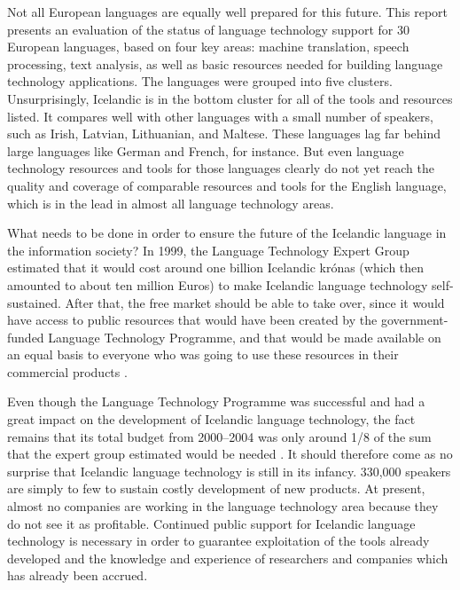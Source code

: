 \begin{multicols}{2}
Not all European languages are equally well prepared for this future. This report presents an evaluation of the status of language technology support for 30 European languages, based on four key areas: machine translation, speech processing, text analysis, as well as basic resources needed for building language technology applications. The languages were grouped into five clusters. Unsurprisingly, Icelandic is in the bottom cluster for all of the tools and resources listed. It compares well with other languages with a small number of speakers, such as Irish, Latvian, Lithuanian, and Maltese. These languages lag far behind large languages like German and French, for instance. But even language technology resources and tools for those languages clearly do not yet reach the quality and coverage of comparable resources and tools for the English language, which is in the lead in almost all language technology areas.

What needs to be done in order to ensure the future of the Icelandic language in the information society? In 1999, the Language Technology Expert Group estimated that it would cost around one billion Icelandic krónas (which then amounted to about ten million Euros) to make Icelandic language technology self-sustained. After that, the free market should be able to take over, since it would have access to public resources that would have been created by the government-funded Language Technology Programme, and that would be made available on an equal basis to everyone who was going to use these resources in their commercial products \cite{sky1}.

Even though the Language Technology Programme was successful and had a great impact on the development of Icelandic language technology, the fact remains that its total budget from 2000--2004 was only around 1/8 of the sum that the expert group estimated would be needed \cite{ilrt1}.  It should therefore come as no surprise that Icelandic language technology is still in its infancy. 330,000 speakers are simply to few to sustain costly development of new products. At present, almost no companies are working in the language technology area because they do not see it as profitable. Continued public support for Icelandic language technology is necessary in order to guarantee exploitation of the tools already developed and the knowledge and experience of researchers and companies which has already been accrued.


\end{multicols}

